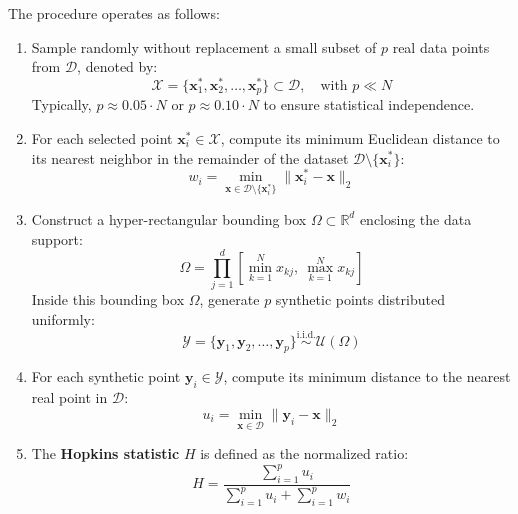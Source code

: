 The procedure operates as follows:
\begin{enumerate}
    \item Sample randomly without replacement a small subset of $p$ real data points from $\mathcal{D}$, denoted by:
    \begin{equation}
    \label{eq:dm-hopkins-real-sample-en}
    \mathcal{X} = \{\mathbf{x}_1^*, \mathbf{x}_2^*, \dots, \mathbf{x}_p^*\} \subset \mathcal{D}, \quad \text{with } p \ll N
    \end{equation}
    Typically, $p \approx 0.05 \cdot N$ or $p \approx 0.10 \cdot N$ to ensure statistical independence.
    
    \item For each selected point $\mathbf{x}_i^* \in \mathcal{X}$, compute its minimum Euclidean distance to its nearest neighbor in the remainder of the dataset $\mathcal{D} \setminus \{\mathbf{x}_i^*\}$:
    \begin{equation}
    \label{eq:dm-hopkins-w-distance-en}
    w_i = \min_{\mathbf{x} \in \mathcal{D} \setminus \{\mathbf{x}_i^*\}} \|\mathbf{x}_i^* - \mathbf{x}\|_2
    \end{equation}
    
    \item Construct a hyper-rectangular bounding box $\Omega \subset \mathbb{R}^d$ enclosing the data support:
    \begin{equation}
    \label{eq:dm-hopkins-bounding-box-en}
    \Omega = \prod_{j=1}^d \left[\min_{k=1}^N x_{kj}, \ \max_{k=1}^N x_{kj}\right]
    \end{equation}
    Inside this bounding box $\Omega$, generate $p$ synthetic points distributed uniformly:
    \begin{equation}
    \label{eq:dm-hopkins-synthetic-sample-en}
    \mathcal{Y} = \{\mathbf{y}_1, \mathbf{y}_2, \dots, \mathbf{y}_p\} \stackrel{\mathrm{i.i.d.}}{\sim} \mathcal{U}(\Omega)
    \end{equation}
    
    \item For each synthetic point $\mathbf{y}_i \in \mathcal{Y}$, compute its minimum distance to the nearest real point in $\mathcal{D}$:
    \begin{equation}
    \label{eq:dm-hopkins-u-distance-en}
    u_i = \min_{\mathbf{x} \in \mathcal{D}} \|\mathbf{y}_i - \mathbf{x}\|_2
    \end{equation}
    
    \item The \textbf{Hopkins statistic} $H$ is defined as the normalized ratio:
    \begin{equation}
    \label{eq:dm-hopkins-formula-en}
    H = \frac{\sum_{i=1}^p u_i}{\sum_{i=1}^p u_i + \sum_{i=1}^p w_i}
    \end{equation}
\end{enumerate}


